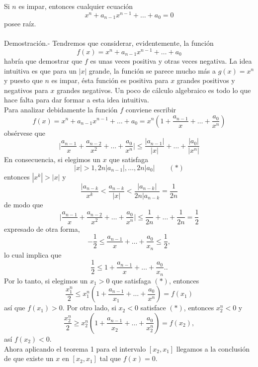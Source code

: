 \begin{teo}
    Si $n$ es impar, entonces cualquier ecuación 
    $$x^n + a_{n-1}x^{n-1}+\ldots + a_0 = 0$$
    posee raíz.\\\\
	Demostración.-\; Tendremos que considerar, evidentemente, la función 
	$$f(x) = x^n + a_{n-1}x^{n-1} + \ldots + a_0$$
	habría que demostrar que $f$ es unas veces positiva y otras veces negativa. La idea intuitiva es que para un $|x|$ grande, la función se parece mucho más a $g(x)=x^n$ y puesto que $n$ es impar, ésta función es positiva para $x$ grandes positivos y negativos para $x$ grandes negativos. Un poco de cálculo algebraico es todo lo que hace falta para dar formar a esta idea intuitiva.\\
	Para analizar debidamente la función $f$ conviene escribir 
	$$f(x) = x^n + a_{n-1}x^{n-1}+\ldots + a_0 = x^n\left(1+\dfrac{a_{n-1}}{x} + \ldots + \dfrac{a_0}{x^n}\right)$$
	obsérvese que
	$$\bigg| \dfrac{a_{n-1}}{x} + \dfrac{a_{n-2}}{x^2} + \ldots + \dfrac{a_0}{x^n} \bigg|\leq \dfrac{|a_{n-1}|}{|x|} + \ldots + \dfrac{|a_0|}{|x^n|}$$
	En consecuencia, si elegimos un $x$ que satisfaga
	$$|x|>1,2n|a_{n-1}|,\ldots,2n|a_0|\qquad (*)$$
	entonces $|x^k| > |x|$ y 
	$$\dfrac{|a_{n-k}}{x^k}<\dfrac{a_{n-k}}{|x|}<\dfrac{|a_{n-k}|}{2n|a_{n-k}}=\dfrac{1}{2n}$$
	de modo que 
	$$\bigg| \dfrac{a_{n-1}}{x} + \dfrac{a_{n-2}}{x^2} + \ldots + \dfrac{a_0}{x^n} \bigg|\leq \dfrac{1}{2n}+\ldots + \dfrac{1}{2n}=\dfrac{1}{2}$$
	expresado de otra forma,
	$$-\dfrac{1}{2}\leq \dfrac{a_{n-1}}{x}+\ldots + \dfrac{a_0}{x_n}\leq \dfrac{1}{2},$$
	lo cual implica que 
	$$\dfrac{1}{2}\leq 1 + \dfrac{a_{n-1}}{x}+\ldots + \dfrac{a_0}{x_n}..$$
	Por lo tanto, si elegimos un $x_1>0$ que satisfaga $(*)$, entonces 
	$$\dfrac{x_1^n}{2} \leq x_1^n \left(1+\dfrac{a_{n-1}}{x_1}+\ldots + \dfrac{a_0}{x^n}\right) = f(x_1)$$
	así que $f(x_1)>0$. Por otro lado, si $x_2<0$ satisface $(*)$, entonces $x_2^n < 0$ y 
	$$\dfrac{x_2^n}{2}\geq x_2^n \left(1+\dfrac{a_{n-1}}{x_2}+\ldots + \dfrac{a_0}{x_2^n}\right)=f(x_2),$$
	así $f(x_2)<0$. \\
	Ahora aplicando el teorema 1 para el intervalo $[x_2,x_1]$ llegamos a la conclusión de que existe un $x$ en $[x_2,x_1]$ tal que $f(x)=0$.\\\\

\end{teo}

